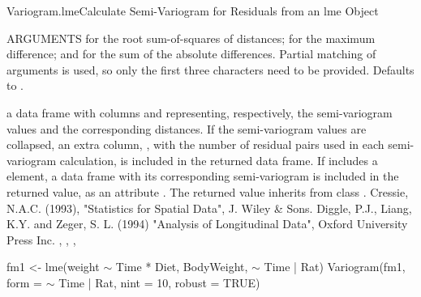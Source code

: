 \documentclass[pdftex]{article} \usepackage{url,graphicx}
\renewcommand{\Twiddle}{\mbox{\(\sim\)}}
\begin{document}
\begin{Helpfile}{Variogram.lme}{Calculate Semi-Variogram for Residuals
    from an lme Object}
\begin{Argument}{ARGUMENTS}
 for the root sum-of-squares of distances;
 for the maximum difference; and 
for the sum of the absolute differences. Partial matching of
arguments is used, so only the first three characters need to be
provided. Defaults to .
\end{Argument}
a data frame with columns  and  representing,
respectively, the semi-variogram values and the corresponding
distances. If the semi-variogram values are collapsed, an extra
column, , with the number of residual pairs used in each
semi-variogram calculation, is included in the returned data frame. If
 includes a  element, a data frame with
its corresponding semi-variogram is included in the returned value, as
an attribute . The returned value inherits from
class .
Cressie, N.A.C. (1993), "Statistics for Spatial Data", J. Wiley \& Sons.
Diggle, P.J., Liang, K.Y. and Zeger, S. L. (1994) "Analysis of
Longitudinal Data", Oxford University Press Inc. 
, ,
, 
\need 15pt
\vspace{-16pt}
\begin{Example}
fm1 <- lme(weight {\Twiddle} Time * Diet, BodyWeight, {\Twiddle} Time | Rat)
Variogram(fm1, form = {\Twiddle} Time | Rat, nint = 10, robust = TRUE)
\end{Example}
\end{Helpfile}
\end{document}
